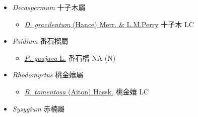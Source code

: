 
  \begin{itemize}
 \item[] \textit{Decaspermum} 十子木屬
                                
  \begin{itemize}
        \item[] \href{http://www.theplantlist.org/tpl1.1/search?q=Decaspermum+gracilentum}{\textit{D. gracilentum} (Hance) Merr. \& L.M.Perry}   十子木   LC
  \end{itemize}
 \item[] \textit{Psidium} 番石榴屬
                                
  \begin{itemize}
        \item[] \href{http://www.theplantlist.org/tpl1.1/search?q=Psidium+guajava}{\textit{P. guajava} L.}   番石榴   NA (N)
  \end{itemize}
 \item[] \textit{Rhodomyrtus} 桃金孃屬
                                
  \begin{itemize}
        \item[] \href{http://www.theplantlist.org/tpl1.1/search?q=Rhodomyrtus+tomentosa}{\textit{R. tomentosa} (Aiton) Hassk.}   桃金孃   LC
  \end{itemize}
 \item[] \textit{Syzygium} 赤楠屬
                                

\end{itemize}

